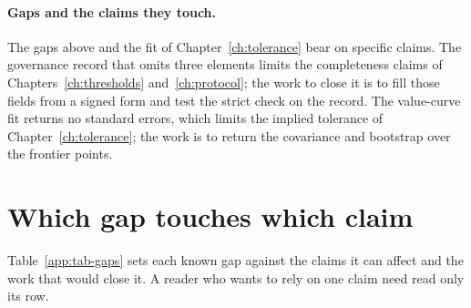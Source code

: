 \paragraph{Gaps and the claims they touch.} The gaps above and the fit of
Chapter~\ref{ch:tolerance} bear on specific claims. The governance record that omits three
elements limits the completeness claims of Chapters~\ref{ch:thresholds} and~\ref{ch:protocol};
the work to close it is to fill those fields from a signed form and test the strict check on
the record. The value-curve fit returns no standard errors, which limits the implied tolerance
of Chapter~\ref{ch:tolerance}; the work is to return the covariance and bootstrap over the
frontier points.

\section{Which gap touches which claim}\label{app:gapclaims}

Table~\ref{app:tab-gaps} sets each known gap against the claims it can affect and the work
that would close it. A reader who wants to rely on one claim need read only its row.


